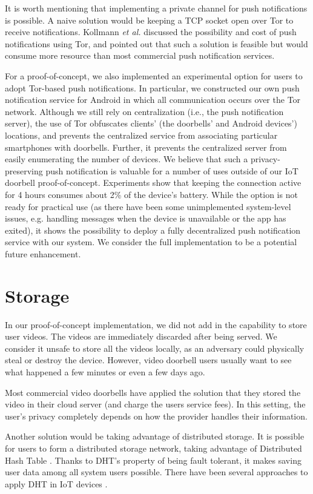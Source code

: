 It is worth mentioning that implementing a private channel for push notifications is possible. A naive solution would be keeping a TCP socket open over Tor to receive notifications. Kollmann \textit{et al.} \cite{kollmann2017cost} discussed the possibility and cost of push notifications using Tor, and pointed out that such a solution is feasible but would consume more resource than most commercial push notification services.

For a proof-of-concept, we also implemented an experimental option for users to adopt Tor-based push notifications. In particular, we constructed our own push notification service for Android in which all communication occurs over the Tor network. Although we still rely on centralization (i.e., the push notification server), the use of Tor obfuscates clients' (the doorbells' and Android devices') locations, and prevents the centralized service from associating particular smartphones with doorbells. Further, it prevents the centralized server from easily enumerating the number of devices. We believe that such a privacy-preserving push notification is valuable for a number of uses outside of our IoT doorbell proof-of-concept. Experiments show that keeping the connection active for 4 hours consumes about 2\% of the device's battery. While the option is not ready for practical use (as there have been some unimplemented system-level issues, e.g. handling messages when the device is unavailable or the app has exited), it shows the possibility to deploy a fully decentralized push notification service with our system. We consider the full implementation to be a potential future enhancement.

\section{Storage}
In our proof-of-concept implementation, we did not add in the capability to store user videos. The videos are immediately discarded after being served. We consider it unsafe to store all the videos locally, as an adversary could physically steal or destroy the device. However, video doorbell users usually want to see what happened a few minutes or even a few days ago.

Most commercial video doorbells have applied the solution that they stored the video in their cloud server (and charge the users service fees). In this setting, the user's privacy completely depends on how the provider handles their information.

Another solution would be taking advantage of distributed storage. It is possible for users to form a distributed storage network, taking advantage of Distributed Hash Table \cite{stoica2001chord}. Thanks to DHT's property of being fault tolerant, it makes saving user data among all system users possible. There have been several approaches to apply DHT in IoT devices \cite{fabian2014privacy} \cite{paganelli2012dht}.

